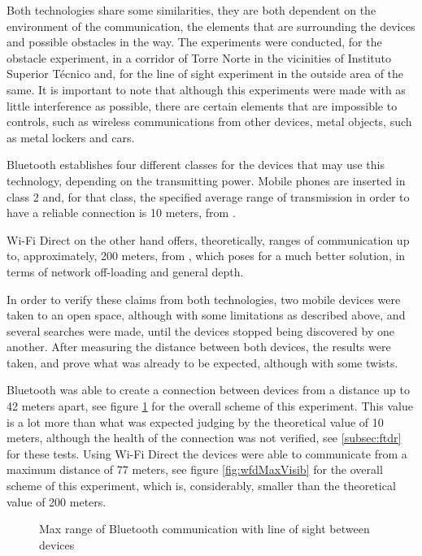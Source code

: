 Both technologies share some similarities, they are both dependent on the environment of the communication, the elements that are surrounding the devices and possible obstacles in the way. The experiments were conducted, for the obstacle experiment, in a corridor of Torre Norte in the vicinities of Instituto Superior Técnico and, for the line of sight experiment in the outside area of the same. It is important to note that although this experiments were made with as little interference as possible, there are certain elements that are impossible to controls, such as wireless communications from other devices, metal objects, such as metal lockers and cars.

Bluetooth establishes four different classes for the devices that may use this technology, depending on the transmitting power. Mobile phones are inserted in class 2 and, for that class, the specified average range of transmission in order to have a reliable connection is 10 meters, from \cite{bluetooth}.

Wi-Fi Direct on the other hand offers, theoretically, ranges of communication up to, approximately, 200 meters, from \cite{wfdrange}, which poses for a much better solution, in terms of network off-loading and general depth.

In order to verify these claims from both technologies, two mobile devices were taken to an open space, although with some limitations as described above, and several searches were made, until the devices stopped being discovered by one another. After measuring the distance between both devices, the results were taken, and prove what was already to be expected, although with some twists. 

Bluetooth was able to create a connection between devices from a distance up to 42 meters apart, see figure \ref{fig:btMaxVisib} for the overall scheme of this experiment. This value is a lot more than what was expected judging by the theoretical value of 10 meters, although the health of the connection was not verified, see \ref{subsec:ftdr} for these tests. Using Wi-Fi Direct the devices were able to communicate from a maximum distance of 77 meters, see figure \ref{fig:wfdMaxVisib} for the overall scheme of this experiment, which is, considerably, smaller than the theoretical value of 200 meters.

\begin{figure}[ht]
   \noindent{}
	\caption{\label{fig:btMaxVisib} Max range of Bluetooth communication with line of sight between devices}
\end{figure}


